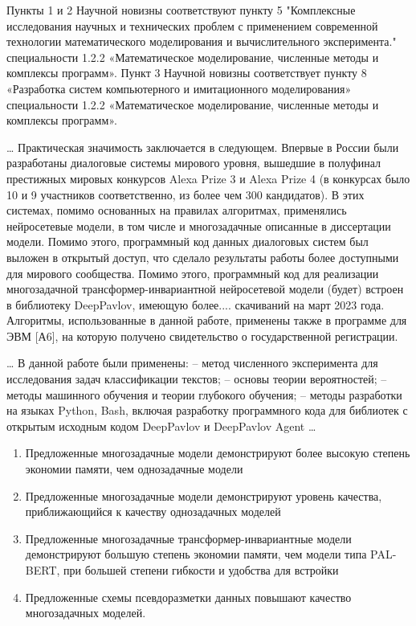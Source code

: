 Пункты 1 и 2 Научной новизны соответствуют пункту 5 "Комплексные исследования научных и технических проблем с применением современной технологии математического моделирования и
вычислительного эксперимента." специальности 1.2.2 «Математическое моделирование, численные методы и комплексы программ». Пункт 3  Научной новизны соответствует пункту 8 «Разработка систем компьютерного и имитаци­онного моделирования» специальности 1.2.2 «Математическое моделирование,
численные методы и комплексы программ».


{\influence} \ldots
Практическая значимость заключается в следующем. Впервые в России были разработаны диалоговые системы мирового уровня, вышедшие в полуфинал престижных мировых конкурсов Alexa Prize 3 и Alexa Prize 4 (в конкурсах было 10 и 9 участников соответственно, из более чем 300 кандидатов). В этих системах, помимо основанных на правилах алгоритмах, применялись нейросетевые модели, в том числе и многозадачные описанные в диссертации модели. Помимо этого, программный код данных диалоговых систем был выложен в открытый доступ, что сделало результаты работы более доступными для мирового сообщества.
Помимо этого, программный код для реализации многозадачной трансформер-инвариантной нейросетевой модели (будет) встроен в библиотеку DeepPavlov, имеющую более.... скачиваний на март 2023 года.
Алгоритмы, использованные в данной работе, применены также в программе для ЭВМ [А6], на которую получено свидетельство о государственной регистрации.


{\methods} \ldots
В данной работе были
применены:
– метод численного эксперимента для исследования задач классифи­кации текстов;
– основы теории вероятностей;
– методы машинного обучения и теории глубокого обучения;
– методы разработки на языках Python, Bash, включая разработку программного кода для библиотек с открытым исходным кодом
DeepPavlov и DeepPavlov Agent
\ldots

{}
\begin{enumerate}
\item Предложенные многозадачные модели демонстрируют более высокую степень экономии памяти, чем однозадачные модели
\item Предложенные многозадачные модели демонстрируют уровень качества, приближающийся к качеству однозадачных моделей
\item Предложенные многозадачные трансформер-инвариантные модели демонстрируют большую степень экономии памяти, чем модели типа PAL-BERT, при большей степени гибкости и удобства для встройки
\item Предложенные схемы псевдоразметки данных повышают качество многозадачных моделей.
\end{enumerate}


